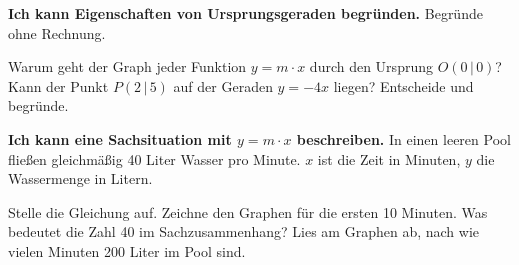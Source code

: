 \begin{aufgabe}{\textbf{Ich kann Eigenschaften von Ursprungsgeraden begründen.} Begründe ohne Rechnung.}
\begin{teile}
\teil Warum geht der Graph jeder Funktion $y = m \cdot x$ durch den Ursprung $O(0\,|\,0)$?
\teil Kann der Punkt $P(2\,|\,5)$ auf der Geraden $y = -4x$ liegen? Entscheide und begründe.
\end{teile}
\end{aufgabe}

\begin{aufgabe}{\textbf{Ich kann eine Sachsituation mit $y = m \cdot x$ beschreiben.} In einen leeren Pool fließen gleichmäßig 40 Liter Wasser pro Minute. $x$ ist die Zeit in Minuten, $y$ die Wassermenge in Litern.}
\begin{teile}
\teil Stelle die Gleichung auf. \quad {}
\teil Zeichne den Graphen für die ersten 10 Minuten.
\teil Was bedeutet die Zahl 40 im Sachzusammenhang? Lies am Graphen ab, nach wie vielen Minuten 200 Liter im Pool sind.
\end{teile}

\begin{ksys}[xmin=0,xmax=10,ymin=0,ymax=400,xstep=1,ystep=50,xlabel=$x$ in min,ylabel=$y$ in l]
\end{ksys}

\end{aufgabe}
